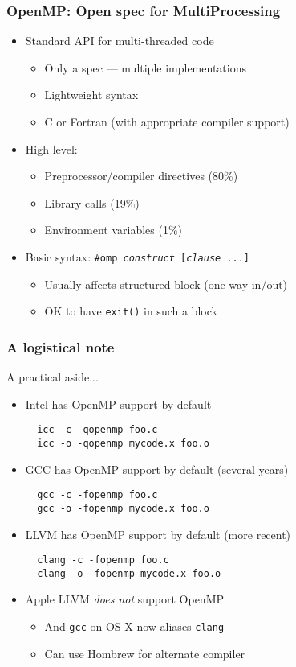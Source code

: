 \documentclass{beamer}
\begin{document}
\begin{frame}
  \frametitle{OpenMP: Open spec for MultiProcessing}

  \begin{itemize}
  \item Standard API for multi-threaded code
    \begin{itemize}
    \item Only a spec --- multiple implementations
    \item Lightweight syntax
    \item C or Fortran (with appropriate compiler support)
    \end{itemize}
  \item High level:
    \begin{itemize}
    \item Preprocessor/compiler directives (80\%)
    \item Library calls (19\%)
    \item Environment variables (1\%)
    \end{itemize}
  \item Basic syntax: {\tt \#omp {\it construct} [{\it clause} ...]}
    \begin{itemize}
    \item Usually affects structured block (one way in/out)
    \item OK to have {\tt exit()} in such a block
    \end{itemize}
  \end{itemize}
\end{frame}


\begin{frame}[fragile]
  \frametitle{A logistical note}

  A practical aside...
  \begin{itemize}
  \item Intel has OpenMP support by default
\begin{verbatim}
  icc -c -qopenmp foo.c
  icc -o -qopenmp mycode.x foo.o
\end{verbatim}
  \item GCC has OpenMP support by default (several years)
\begin{verbatim}
  gcc -c -fopenmp foo.c
  gcc -o -fopenmp mycode.x foo.o
\end{verbatim}
  \item LLVM has OpenMP support by default (more recent)
\begin{verbatim}
  clang -c -fopenmp foo.c
  clang -o -fopenmp mycode.x foo.o
\end{verbatim}
  \item Apple LLVM {\em does not} support OpenMP
    \begin{itemize}
    \item And {\tt gcc} on OS X now aliases {\tt clang}
    \item Can use Hombrew for alternate compiler
    \end{itemize}
  \end{itemize}
\end{frame}
\end{document}
